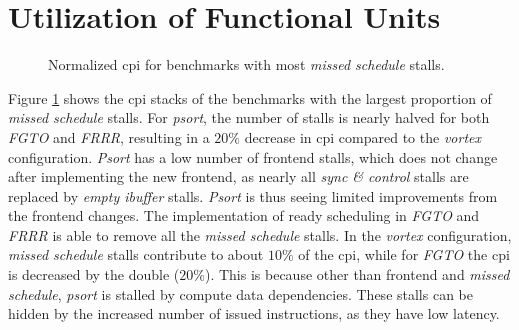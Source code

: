 \section{Utilization of Functional Units}

\begin{figure}
    \centering
    \caption[Normalized \acrshort{cpi} for benchmarks with missed schedule opportunities.]{Normalized \acrshort{cpi} for benchmarks with most \textit{missed schedule} stalls.}
    \label{fig:cpi_missed_schedule}
\end{figure}

Figure \ref{fig:cpi_missed_schedule} shows the \acrshort{cpi} stacks of the benchmarks with the largest proportion of \textit{missed schedule} stalls. For \textit{psort}, the number of stalls is nearly halved for both \textit{FGTO} and \textit{FRRR}, resulting in a $20\%$ decrease in \acrshort{cpi} compared to the \textit{\Gls{vortex}} configuration. \textit{Psort} has a low number of frontend stalls, which does not change after implementing the new frontend, as nearly all \textit{sync \& control} stalls are replaced by \textit{empty ibuffer} stalls. \textit{Psort} is thus seeing limited improvements from the frontend changes. The implementation of ready scheduling in \textit{FGTO} and \textit{FRRR} is able to remove all the \textit{missed schedule} stalls. In the \textit{\Gls{vortex}} configuration, \textit{missed schedule} stalls contribute to about $10\%$ of the \acrshort{cpi}, while for \textit{FGTO} the \acrshort{cpi} is decreased by the double ($20\%$). This is because other than frontend and \textit{missed schedule}, \textit{psort} is stalled by compute data dependencies. These stalls can be hidden by the increased number of issued instructions, as they have low latency.

